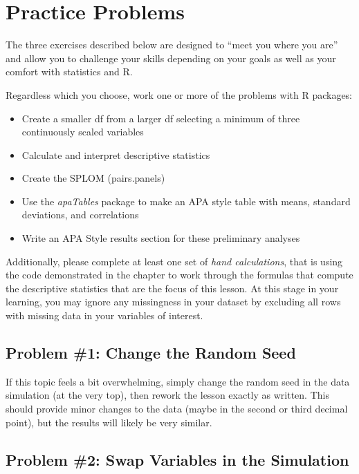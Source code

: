 \documentclass[
  11pt,
]{book}
\providecommand{\tightlist}{%
  \setlength{\itemsep}{0pt}\setlength{\parskip}{0pt}}
\begin{document}
\hypertarget{practice-problems-1}{%
\section{Practice Problems}\label{practice-problems-1}}

The three exercises described below are designed to ``meet you where you are'' and allow you to challenge your skills depending on your goals as well as your comfort with statistics and R.

Regardless which you choose, work one or more of the problems with R packages:

\begin{itemize}
\tightlist
\item
  Create a smaller df from a larger df selecting a minimum of three continuously scaled variables
\item
  Calculate and interpret descriptive statistics
\item
  Create the SPLOM (pairs.panels)
\item
  Use the \emph{apaTables} package to make an APA style table with means, standard deviations, and correlations
\item
  Write an APA Style results section for these preliminary analyses
\end{itemize}

Additionally, please complete at least one set of \emph{hand calculations}, that is using the code demonstrated in the chapter to work through the formulas that compute the descriptive statistics that are the focus of this lesson. At this stage in your learning, you may ignore any missingness in your dataset by excluding all rows with missing data in your variables of interest.

\hypertarget{problem-1-change-the-random-seed}{%
\subsection{Problem \#1: Change the Random Seed}\label{problem-1-change-the-random-seed}}

If this topic feels a bit overwhelming, simply change the random seed in the data simulation (at the very top), then rework the lesson exactly as written. This should provide minor changes to the data (maybe in the second or third decimal point), but the results will likely be very similar.

\hypertarget{problem-2-swap-variables-in-the-simulation}{%
\subsection{Problem \#2: Swap Variables in the Simulation}\label{problem-2-swap-variables-in-the-simulation}}
\end{document}
